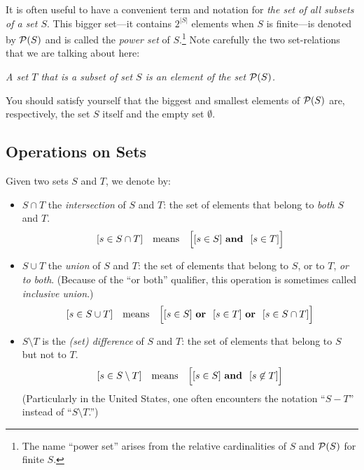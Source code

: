 It is often useful to have a convenient term and notation for {\em the
  set of all subsets of a set $S$}.  This bigger set---it contains
$2^{|S|}$ elements when $S$ is finite---is denoted by $\mbox{$\cal P$}(S)$ and is
called the {\em power set} of
$S$.\footnote{The name ``power set'' arises from the relative
  cardinalities of $S$ and ${\cal P}(S)$ for finite $S$.}  Note
carefully the two set-relations that we are talking about here:

{\em A set $T$ that is a {\em subset} of set $S$ is an {\em element}
  of the set $\mbox{$\cal P$}(S)$.}

\noindent
You should satisfy yourself that the biggest and smallest elements of
${\cal P}(S)$ are, respectively, the set $S$ itself and the empty set
$\emptyset$.

\subsection{Operations on Sets}
\label{sec:set-operations}

Given two sets $S$ and $T$, we denote by:
\begin{itemize}
\item
$S \cap T$ the {\it
  intersection}
of $S$ and $T$: the set of elements that belong to {\em both} $S$ and
$T$.
\[ [s \in S \cap T] \ \ \mbox{ means } \ \ 
\Big[ [s \in S] \ \mbox{\bf and } \ [s \in T] \Big]
\]

\item
$S \cup T$ the {\it
  union}
of $S$ and $T$: the set of elements that belong to $S$, or to $T$, {\em
  or to both}.  (Because of the ``or both'' qualifier, this operation
is sometimes called {\em inclusive
  union}.)
\[ [s \in S \cup T] \ \ \mbox{ means } \ \
\Big[ [s \in S] \ \mbox{\bf or } \ [s \in T]  \ \mbox{\bf or } \ [s
    \in S \cap T] \Big]
\]


\item
$S \setminus T$ is the {\em
  (set) difference} of $S$ and
  $T$: the set of elements that belong to $S$ but not to $T$.
\[ [s \in S \setminus T] \ \ \mbox{ means } \ \
\Big[ [s \in S] \ \mbox{\bf and } \ [s \not\in T] \Big]
\]
(Particularly in the United States, one often encounters the notation
 ``$S-T$''\index{$S - T$: set difference} instead of ``$S \setminus
 T$.'')
\end{itemize}

